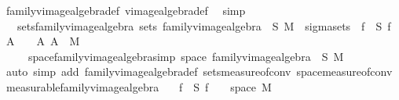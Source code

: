 \begin{isabellebody}
\ family{\isacharunderscore}{\kern0pt}vimage{\isacharunderscore}{\kern0pt}algebra{\isacharunderscore}{\kern0pt}def\ vimage{\isacharunderscore}{\kern0pt}algebra{\isacharunderscore}{\kern0pt}def\ \isamarkupfalse%
\ simp%
\endisatagproof
{\isafoldproof}%
%
\isadelimproof
%
\endisadelimproof
\isanewline
\isanewline
{}\isamarkupfalse%
\isanewline
\ \ \ sets{\isacharunderscore}{\kern0pt}family{\isacharunderscore}{\kern0pt}vimage{\isacharunderscore}{\kern0pt}algebra{\isacharcolon}{\kern0pt}\ {\isachardoublequoteopen}sets\ {\isacharparenleft}{\kern0pt}family{\isacharunderscore}{\kern0pt}vimage{\isacharunderscore}{\kern0pt}algebra\ {\isasymOmega}\ S\ M{\isacharparenright}{\kern0pt}\ {\isacharequal}{\kern0pt}\ sigma{\isacharunderscore}{\kern0pt}sets\ {\isasymOmega}\ {\isacharparenleft}{\kern0pt}{\isasymUnion}f\ {\isasymin}\ S{\isachardot}{\kern0pt}\ {\isacharbraceleft}{\kern0pt}f\ {\isacharminus}{\kern0pt}{\isacharbackquote}{\kern0pt}\ A\ {\isasyminter}\ {\isasymOmega}\ {\isacharbar}{\kern0pt}\ A{\isachardot}{\kern0pt}\ A\ {\isasymin}\ M{\isacharbraceright}{\kern0pt}{\isacharparenright}{\kern0pt}{\isachardoublequoteclose}\ \isanewline
\ \ \ \ \ space{\isacharunderscore}{\kern0pt}family{\isacharunderscore}{\kern0pt}vimage{\isacharunderscore}{\kern0pt}algebra{\isacharbrackleft}{\kern0pt}simp{\isacharbrackright}{\kern0pt}{\isacharcolon}{\kern0pt}\ {\isachardoublequoteopen}space\ {\isacharparenleft}{\kern0pt}family{\isacharunderscore}{\kern0pt}vimage{\isacharunderscore}{\kern0pt}algebra\ {\isasymOmega}\ S\ M{\isacharparenright}{\kern0pt}\ {\isacharequal}{\kern0pt}\ {\isasymOmega}{\isachardoublequoteclose}\isanewline
%
\isadelimproof
\ \ %
\endisadelimproof
%
\isatagproof
{}\isamarkupfalse%
\ {\isacharparenleft}{\kern0pt}auto\ simp\ add{\isacharcolon}{\kern0pt}\ family{\isacharunderscore}{\kern0pt}vimage{\isacharunderscore}{\kern0pt}algebra{\isacharunderscore}{\kern0pt}def\ sets{\isacharunderscore}{\kern0pt}measure{\isacharunderscore}{\kern0pt}of{\isacharunderscore}{\kern0pt}conv\ space{\isacharunderscore}{\kern0pt}measure{\isacharunderscore}{\kern0pt}of{\isacharunderscore}{\kern0pt}conv{\isacharparenright}{\kern0pt}%
\endisatagproof
{\isafoldproof}%
%
\isadelimproof
\isanewline
%
\endisadelimproof
\isanewline
{}\isamarkupfalse%
\ measurable{\isacharunderscore}{\kern0pt}family{\isacharunderscore}{\kern0pt}vimage{\isacharunderscore}{\kern0pt}algebra{\isacharcolon}{\kern0pt}\isanewline
\ \ \ {\isachardoublequoteopen}f\ {\isasymin}\ S{\isachardoublequoteclose}\ {\isachardoublequoteopen}f\ {\isasymin}\ {\isasymOmega}\ {\isasymrightarrow}\ space\ M{\isachardoublequoteclose}\isanewline

\end{isabellebody}
